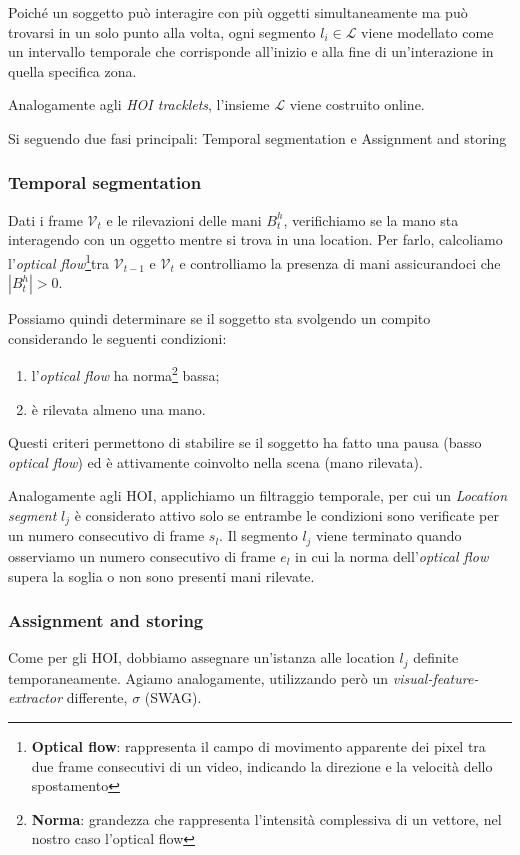 Poiché un soggetto può interagire con più oggetti simultaneamente ma può trovarsi in un solo punto alla volta, ogni segmento $l_i \in \mathcal{L}$ viene modellato come un intervallo temporale che corrisponde all'inizio e alla fine di un'interazione in quella specifica zona.  

Analogamente agli \emph{HOI tracklets}, l'insieme $\mathcal{L}$ viene costruito online.

Si seguendo due fasi principali: Temporal segmentation e Assignment and storing

\subsubsection*{Temporal segmentation}
Dati i frame $\mathcal{V}_t$ e le rilevazioni delle mani $B_t^h$, verifichiamo se la mano sta interagendo con un oggetto mentre si trova in una location. Per farlo, calcoliamo l'\emph{optical flow}\footnote{\textbf{Optical flow}: rappresenta il campo di movimento apparente dei pixel tra due frame consecutivi di un video, indicando la direzione e la velocità dello spostamento}tra $\mathcal{V}_{t-1}$ e $\mathcal{V}_t$ e controlliamo la presenza di mani assicurandoci che $|B_t^h|>0$.

Possiamo quindi determinare se il soggetto sta svolgendo un compito considerando le seguenti condizioni:
\begin{enumerate}
    \item l'\emph{optical flow} ha norma\footnote{\textbf{Norma}: grandezza che rappresenta l'intensità complessiva di un vettore, nel nostro caso l'optical flow} bassa;
    \item è rilevata almeno una mano.
\end{enumerate}
Questi criteri permettono di stabilire se il soggetto ha fatto una pausa (basso \emph{optical flow}) ed è attivamente coinvolto nella scena (mano rilevata).

Analogamente agli HOI, applichiamo un filtraggio temporale, per cui un \emph{Location segment} $l_j$ è considerato attivo solo se entrambe le condizioni sono verificate per un numero consecutivo di frame $s_l$. Il segmento $l_j$ viene terminato quando osserviamo un numero consecutivo di frame $e_l$ in cui la norma dell'\emph{optical flow} supera la soglia o non sono presenti mani rilevate.

\subsubsection*{Assignment and storing}
Come per gli HOI, dobbiamo assegnare un'istanza alle location $l_j$ definite temporaneamente. Agiamo analogamente, utilizzando però un \emph{visual-feature-extractor} differente, $\sigma$ (SWAG)\cite{singh2022revisitingweaklysupervisedpretraining}.

